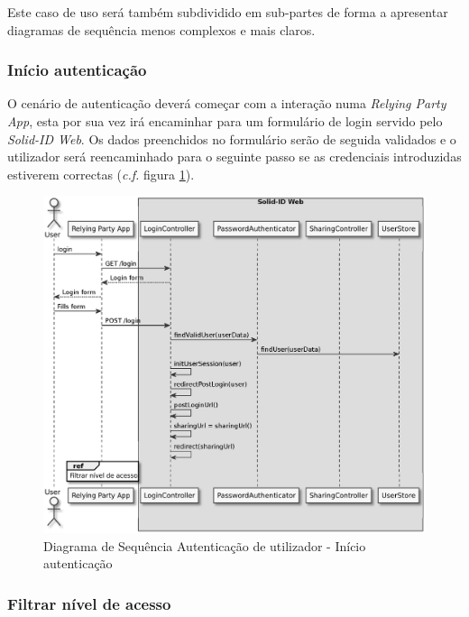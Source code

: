 Este caso de uso será também subdividido em sub-partes de forma a apresentar diagramas de sequência menos complexos e mais claros.

\subsubsection{Início autenticação}

O cenário de autenticação deverá começar com a interação numa \emph{Relying Party App}, esta por sua vez irá encaminhar para um formulário de login servido pelo \emph{Solid-ID Web}. Os dados preenchidos no formulário serão de seguida validados e o utilizador será reencaminhado para o seguinte passo se as credenciais introduzidas estiverem correctas (\emph{c.f.} figura \ref{autenticacao_sd1}).

\begin{figure}[H]
    \begin{center}
    \includegraphics[width=1 \textwidth]{figures/authentication_sd_1.eps}
    \caption{Diagrama de Sequência Autenticação de utilizador - Início autenticação}
        \label{autenticacao_sd1}
    \end{center}
\end{figure}

\subsubsection{Filtrar nível de acesso}


